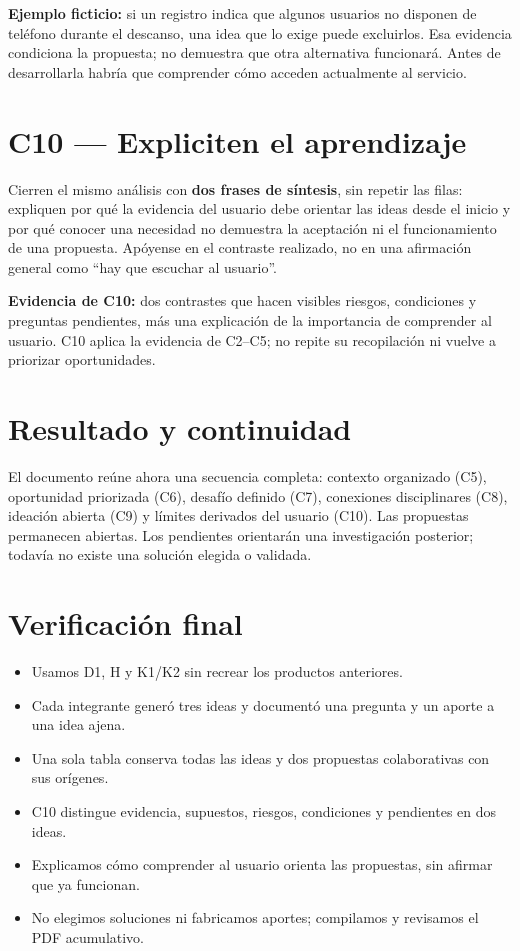 \documentclass[12pt,a4paper]{article}
\newcommand{\concept}[1]{\textcolor{ConceptColor}{\textbf{#1}}}
\newcommand{\checkbox}{\fbox{\rule{0pt}{0.8ex}\rule{0.8ex}{0pt}}}
\begin{document}
\textbf{Ejemplo ficticio:} si un registro indica que algunos usuarios no disponen de teléfono durante el descanso, una idea que lo exige puede excluirlos. Esa evidencia condiciona la propuesta; no demuestra que otra alternativa funcionará. Antes de desarrollarla habría que comprender cómo acceden actualmente al servicio.

\section*{C10 --- Expliciten el aprendizaje}
Cierren el mismo análisis con \textbf{dos frases de síntesis}, sin repetir las filas: expliquen por qué la evidencia del usuario debe orientar las ideas desde el inicio y por qué conocer una necesidad no demuestra la aceptación ni el funcionamiento de una propuesta. Apóyense en el contraste realizado, no en una afirmación general como ``hay que escuchar al usuario''.

\concept{Evidencia de C10:} dos contrastes que hacen visibles riesgos, condiciones y preguntas pendientes, más una explicación de la importancia de comprender al usuario. C10 aplica la evidencia de C2--C5; no repite su recopilación ni vuelve a priorizar oportunidades.

\section*{Resultado y continuidad}
El documento reúne ahora una secuencia completa: contexto organizado (C5), oportunidad priorizada (C6), desafío definido (C7), conexiones disciplinares (C8), ideación abierta (C9) y límites derivados del usuario (C10). Las propuestas permanecen abiertas. Los pendientes orientarán una investigación posterior; todavía no existe una solución elegida o validada.

\section*{Verificación final}
{\small\begin{itemize}[label=\checkbox]
\item Usamos D1, H y K1/K2 sin recrear los productos anteriores.
\item Cada integrante generó tres ideas y documentó una pregunta y un aporte a una idea ajena.
\item Una sola tabla conserva todas las ideas y dos propuestas colaborativas con sus orígenes.
\item C10 distingue evidencia, supuestos, riesgos, condiciones y pendientes en dos ideas.
\item Explicamos cómo comprender al usuario orienta las propuestas, sin afirmar que ya funcionan.
\item No elegimos soluciones ni fabricamos aportes; compilamos y revisamos el PDF acumulativo.
\end{itemize}}
\end{document}
